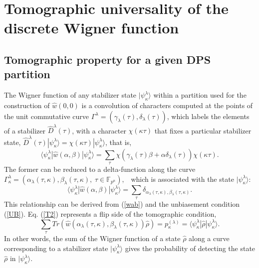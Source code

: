 \documentclass{article}
\begin{document}
\section{Tomographic universality of the discrete Wigner function}

\subsection{Tomographic property for a given DPS partition}

The Wigner function of any stabilizer state $|\psi _{\kappa }^{\lambda
}\rangle $ within a partition used for the construction of $\hat{w}\left(
0,0\right) $ is a convolution of characters computed at the points of the
unit commutative curve $\Gamma ^{\lambda }=\left( \gamma _{\lambda }\left(
\tau \right) ,\delta _{\lambda }(\tau )\right) $, which labels the elements
of a stabilizer $\hat{D}^{\lambda }(\tau )$, with a character $\chi (\kappa
\tau )$ that fixes a particular stabilizer state, $\hat{D}^{\lambda }(\tau
)|\psi _{\kappa }^{\lambda }\rangle =\chi (\kappa \tau )|\psi _{\kappa
}^{\lambda }\rangle $, that is, 
\begin{equation}
\langle \psi _{\kappa }^{\lambda }|\hat{w}\left( \alpha ,\beta \right) |\psi
_{\kappa }^{\lambda }\rangle =\sum_{\tau }\chi \left( \gamma _{\lambda
}\left( \tau \right) \beta +\alpha \delta _{\lambda }(\tau )\right) \chi
(\kappa \tau ).  \label{T1}
\end{equation}%
The former can be reduced to a delta-function along the curve $\Gamma
_{\kappa }^{\lambda }=(\alpha _{\lambda }(\tau ,\kappa ),\beta _{\lambda
}(\tau ,\kappa ),\;\tau \in \mathbb{F}_{p^{n}}),$ \ which is associated with
the state $|\psi _{\kappa }^{\lambda }\rangle $:%
\begin{equation}
\langle \psi _{\kappa }^{\lambda }|\hat{w}\left( \alpha ,\beta \right) |\psi
_{\kappa }^{\lambda }\rangle =\sum_{\tau }\delta _{\alpha _{\lambda }(\tau
,\kappa ),\beta _{\lambda }(\tau ,\kappa )}.  \label{T2}
\end{equation}%
This relationship can be derived from (\ref{wab}) and the unbiasement
condition (\ref{UB}). Eq. (\ref{T2}) represents a flip side of the
tomographic condition, 
\begin{equation}
\sum_{\tau }Tr\left( \hat{w}\left( \alpha _{\lambda }(\tau ,\kappa ),\beta
_{\lambda }(\tau ,\kappa )\right) \hat{\rho}\right) =p_{\kappa }^{(\lambda
)}=\langle \psi _{\kappa }^{\lambda }|\hat{\rho}|\psi _{\kappa }^{\lambda
}\rangle .  \label{T3}
\end{equation}%
In other words, the sum of the Wigner function of a state $\hat{\rho}$ along
a curve corresponding to a stabilizer state $|\psi _{\kappa }^{\lambda
}\rangle $ gives the probability of detecting the state $\hat{\rho}$ in $%
|\psi _{\kappa }^{\lambda }\rangle $.
\end{document}
